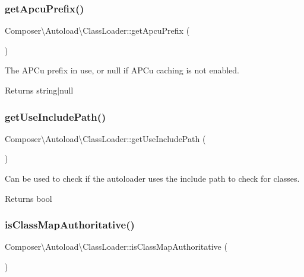\subsubsection{\texorpdfstring{get\+Apcu\+Prefix()}{getApcuPrefix()}}
{\footnotesize\ttfamily Composer\textbackslash{}\+Autoload\textbackslash{}\+Class\+Loader\+::get\+Apcu\+Prefix (\begin{DoxyParamCaption}{ }\end{DoxyParamCaption})}

The A\+P\+Cu prefix in use, or null if A\+P\+Cu caching is not enabled.

\begin{DoxyReturn}{Returns}
string$\vert$null 
\end{DoxyReturn}
\mbox{\label{classComposer_1_1Autoload_1_1ClassLoader_aeb0360ce32c89c3d50cf5b054aef0d59}} 
\subsubsection{\texorpdfstring{get\+Use\+Include\+Path()}{getUseIncludePath()}}
{\footnotesize\ttfamily Composer\textbackslash{}\+Autoload\textbackslash{}\+Class\+Loader\+::get\+Use\+Include\+Path (\begin{DoxyParamCaption}{ }\end{DoxyParamCaption})}

Can be used to check if the autoloader uses the include path to check for classes.

\begin{DoxyReturn}{Returns}
bool 
\end{DoxyReturn}
\mbox{\label{classComposer_1_1Autoload_1_1ClassLoader_abaf3d2e9cad5d740b6a29c44b36cf015}} 
\subsubsection{\texorpdfstring{is\+Class\+Map\+Authoritative()}{isClassMapAuthoritative()}}
{\footnotesize\ttfamily Composer\textbackslash{}\+Autoload\textbackslash{}\+Class\+Loader\+::is\+Class\+Map\+Authoritative (\begin{DoxyParamCaption}{ }\end{DoxyParamCaption})}


